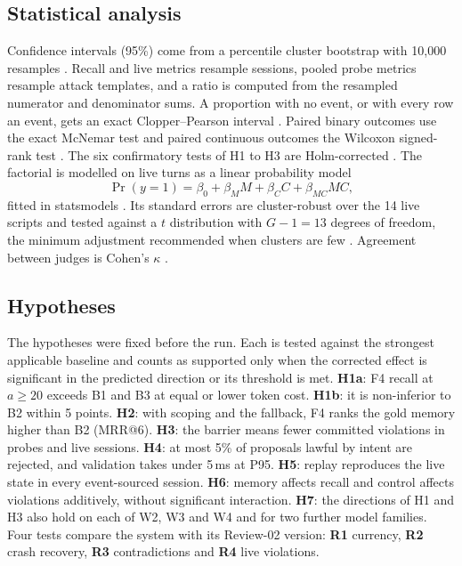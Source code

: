 \documentclass[letterpaper,journal]{IEEEtran}
\begin{document}
\subsection{Statistical analysis}\label{sec:stats}
Confidence intervals (95\%) come from a percentile cluster bootstrap with 10{,}000 resamples \cite{efron1979,field2007clustered}. Recall and live metrics resample sessions, pooled probe metrics resample attack templates, and a ratio is computed from the resampled numerator and denominator sums. A proportion with no event, or with every row an event, gets an exact Clopper--Pearson interval \cite{clopper1934}. Paired binary outcomes use the exact McNemar test \cite{mcnemar1947} and paired continuous outcomes the Wilcoxon signed-rank test \cite{wilcoxon1945}. The six confirmatory tests of H1 to H3 are Holm-corrected \cite{holm1979}. The factorial is modelled on live turns as a linear probability model
\begin{equation}\label{eq:lpm}
\Pr(y=1)=\beta_0+\beta_M M+\beta_C C+\beta_{MC}MC,
\end{equation}
fitted in statsmodels \cite{seabold2010statsmodels}. Its standard errors are cluster-robust over the 14 live scripts and tested against a $t$ distribution with $G-1=13$ degrees of freedom, the minimum adjustment recommended when clusters are few \cite{cameron2015cluster}. Agreement between judges is Cohen's $\kappa$ \cite{cohen1960kappa}.

\subsection{Hypotheses}\label{sec:hyp}
The hypotheses were fixed before the run. Each is tested against the strongest applicable baseline and counts as supported only when the corrected effect is significant in the predicted direction or its threshold is met. \textbf{H1a}: F4 recall at $a\ge20$ exceeds B1 and B3 at equal or lower token cost. \textbf{H1b}: it is non-inferior to B2 within 5 points. \textbf{H2}: with scoping and the fallback, F4 ranks the gold memory higher than B2 (MRR@6). \textbf{H3}: the barrier means fewer committed violations in probes and live sessions. \textbf{H4}: at most 5\% of proposals lawful by intent are rejected, and validation takes under 5\,ms at P95. \textbf{H5}: replay reproduces the live state in every event-sourced session. \textbf{H6}: memory affects recall and control affects violations additively, without significant interaction. \textbf{H7}: the directions of H1 and H3 also hold on each of W2, W3 and W4 and for two further model families. Four tests compare the system with its Review-02 version: \textbf{R1} currency, \textbf{R2} crash recovery, \textbf{R3} contradictions and \textbf{R4} live violations.
\end{document}
